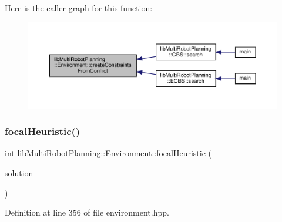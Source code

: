 Here is the caller graph for this function\+:
\nopagebreak
\begin{figure}[H]
\begin{center}
\leavevmode
\includegraphics[width=350pt]{classlib_multi_robot_planning_1_1_environment_a34aca235da8a5a1389ec71507c4191af_icgraph}
\end{center}
\end{figure}
\mbox{\label{classlib_multi_robot_planning_1_1_environment_a7854e1df446e52051492b724c0416956}} 
\subsubsection{\texorpdfstring{focal\+Heuristic()}{focalHeuristic()}}
{\footnotesize\ttfamily int lib\+Multi\+Robot\+Planning\+::\+Environment\+::focal\+Heuristic (\begin{DoxyParamCaption}\item[{const std\+::vector$<$ \hyperlink{structlib_multi_robot_planning_1_1_plan_result}{Plan\+Result}$<$ \hyperlink{structlib_multi_robot_planning_1_1_state}{State}, \hyperlink{namespacelib_multi_robot_planning_aba73fb71693f86a324adfa0e41e1053d}{Action}, int $>$ $>$ \&}]{solution }\end{DoxyParamCaption})\hspace{0.3cm}{\ttfamily [inline]}}



Definition at line 356 of file environment.\+hpp.

